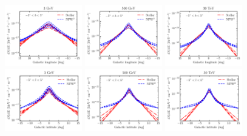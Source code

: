 \documentclass[doublespace,nopageskip]{VTthesis}
\begin{document}
\begin{figure}[htb]
    \centering
    \includegraphics[width=0.3\textwidth]{Figures/IC_MSPs/lon_3gev.pdf}
    \includegraphics[width=0.3\textwidth]{Figures/IC_MSPs/lon_500gev.pdf}
    \includegraphics[width=0.3\textwidth]{Figures/IC_MSPs/lon_30tev.pdf}
    \includegraphics[width=0.3\textwidth]{Figures/IC_MSPs/lat_3gev.pdf}
    \includegraphics[width=0.3\textwidth]{Figures/IC_MSPs/lat_500gev.pdf}
    \includegraphics[width=0.3\textwidth]{Figures/IC_MSPs/lat_30tev.pdf}

\end{figure}
\end{document}
